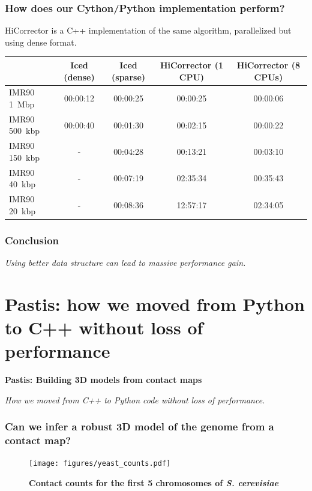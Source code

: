 \documentclass[xcolor=dvipsnames]{beamer}
\begin{document}
\begin{frame}
\frametitle{How does our Cython/Python implementation perform?}

{HiCorrector is a C++ implementation of the same algorithm, parallelized but using dense format.}

\vspace{2em}
\begin{table}
\scriptsize
\begin{tabular}{l | c | c | c | c }
  & {\bf Iced {\tiny (dense)}} & {\bf Iced {\tiny (sparse)}} & {\bf HiCorrector {\tiny (1 CPU)}} & {\bf HiCorrector {\tiny (8 CPUs)}} \\
\hline
IMR90 1~Mbp & 00:00:12 & 00:00:25 & 00:00:25 & 00:00:06 \\
IMR90 500~kbp & 00:00:40 & 00:01:30 & 00:02:15 & 00:00:22 \\
IMR90 150~kbp & - & 00:04:28 & 00:13:21 & 00:03:10 \\
IMR90 40~kbp & - & 00:07:19 & 02:35:34 & 00:35:43 \\
IMR90 20~kbp & - & 00:08:36 & 12:57:17 & 02:34:05 \\
\end{tabular}
\end{table}
\end{frame}

\begin{frame}
\frametitle{Conclusion}
{\Large \em Using better data structure can lead to massive performance gain.}
\end{frame}

\section{Pastis: how we moved from Python to C++ without loss of performance}
\begin{frame}
\Large{ \bf
Pastis: Building 3D models from contact maps}

\begin{flushright}
\vspace{1em}
\small
\textit{How we moved from C++ to Python code without loss of performance.}
\end{flushright}

\end{frame}

\begin{frame}
\frametitle{Can we infer a robust 3D model of the genome from a contact map?}
\vspace{-1em}
\begin{figure}
\texttt{[image: figures/yeast\_counts.pdf]}
\caption{\textbf{Contact counts for the first 5 chromosomes of \textit{S.
cerevisiae}}}
\end{figure}

\end{frame}
\end{document}
